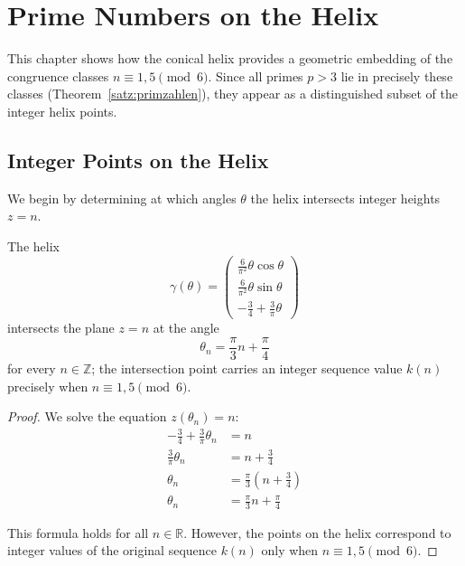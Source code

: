 \chapter{Prime Numbers on the Helix}\label{ch:primes}

This chapter shows how the conical helix provides a geometric
embedding of the congruence classes $n \equiv 1,5\pmod{6}$. Since all
primes $p > 3$ lie in precisely these classes
(Theorem~\ref{satz:primzahlen}), they appear as a distinguished subset
of the integer helix points.

\section{Integer Points on the Helix}

We begin by determining at which angles $\theta$ the helix intersects
integer heights $z = n$.

\begin{theorem}\label{thm:integer-points}
The helix
\[
\gamma(\theta) = \begin{pmatrix}
\frac{6}{\pi^2}\theta\cos\theta\\
\frac{6}{\pi^2}\theta\sin\theta\\
-\frac{3}{4} + \frac{3}{\pi}\theta
\end{pmatrix}
\]
intersects the plane $z = n$ at the angle
\begin{equation}\label{eq:theta-n}
\boxed{\theta_n = \frac{\pi}{3}n + \frac{\pi}{4}}
\end{equation}
for every $n \in \mathbb{Z}$; the intersection point carries an integer
sequence value $k(n)$ precisely when $n \equiv 1, 5 \pmod{6}$.
\end{theorem}

\begin{proof}
We solve the equation $z(\theta_n) = n$:
\begin{align}
-\frac{3}{4} + \frac{3}{\pi}\theta_n &= n\\
\frac{3}{\pi}\theta_n &= n + \frac{3}{4}\\
\theta_n &= \frac{\pi}{3}\left(n + \frac{3}{4}\right)\\
\theta_n &= \frac{\pi}{3}n + \frac{\pi}{4}
\end{align}

This formula holds for all $n \in \mathbb{R}$. However, the points on
the helix correspond to integer values of the original sequence $k(n)$
only when $n \equiv 1, 5 \pmod{6}$.
\end{proof}

